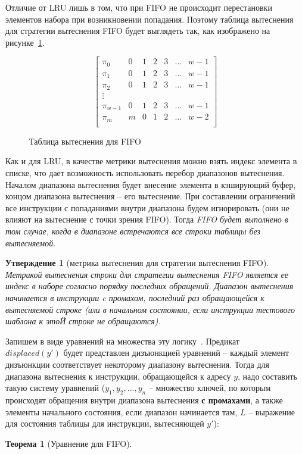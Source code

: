 \documentclass[14pt]{extreport}
\newtheorem{theorem}{Теорема}
\newtheorem{utv}{Утверждение}
\newcommand{\LRU}{\textsf{LRU}\xspace}
\newcommand{\FIFO}{\textsf{FIFO}\xspace}
\begin{document}
Отличие от \LRU лишь в том, что при \FIFO не происходит перестановки
элементов набора при возникновении попадания. Поэтому таблица
вытеснения~\cite{policy_tables} для стратегии вытеснения \FIFO будет
выглядеть так, как изображено на рисунке~\ref{fifo_policy_table}.

\begin{figure}
$$
  \left[
    \begin{array}{c|cccccc}
      \pi_0 & 0 & 1 & 2 & 3 & \dots & w-1 \\
      \pi_1 & 0 & 1 & 2 & 3 & \dots & w-1 \\
      \pi_2 & 0 & 1 & 2 & 3 & \dots & w-1 \\
      \vdots &  &  &  & & & \\
      \pi_{w-1} & 0 & 1 & 2 & 3 & \dots & w-1 \\
      \pi_m & m & 0 & 1 & 2 & \dots & w-2 \\
    \end{array}
  \right]
$$
\caption{Таблица вытеснения для \FIFO}\label{fifo_policy_table}
\end{figure}

Как и для \LRU, в качестве метрики вытеснения можно взять индекс
элемента в списке, что дает возможность использовать перебор
диапазонов вытеснения.
Началом диапазона вытеснения будет внесение элемента в кэширующий
буфер, концом диапазона вытеснения -- его вытеснение. При
составлении ограничений все инструкции с попаданиями внутри
диапазона будем игнорировать (они не влияют на вытеснение с точки
зрения \FIFO). Тогда \emph{\FIFO будет выполнено в том случае, когда
в диапазоне встречаются все строки таблицы без вытесняемой}.

\begin{utv}[метрика вытеснения для стратегии вытеснения \FIFO]
Метрикой вытеснения строки для стратегии вытеснения \FIFO является ее
индекс в наборе согласно порядку последних обращений. Диапазон
вытеснения начинается в инструкции c промахом, последний раз
обращающейся к вытесняемой строке (или в начальном состоянии, если
инструкции тестового шаблона к этоЙ строке не обращаются).
\end{utv}

Запишем в виде уравнений на множества эту логику~\cite{my_nivc_2009}. Предикат\\
$displaced(y')$ будет представлен дизъюнкцией уравнений -- каждый
элемент дизъюнкции соответствует некоторому диапазону вытеснения.
Тогда для диапазона вытеснения к инструкции, обращающейся к адресу
$y$, надо составить такую систему уравнений ($y_1, y_2, ..., y_n$ --
множество ключей, по которым происходят обращения внутри диапазона
вытеснения \textbf{с промахами}, а также элементы начального
состояния, если диапазон начинается там, $L$ -- выражение для
состояния таблицы для инструкции, вытесняющей $y'$):
\begin{theorem}[Уравнение для \FIFO]\label{FIFO_equation} \DiapazonFIFO
\end{theorem}
\end{document}
